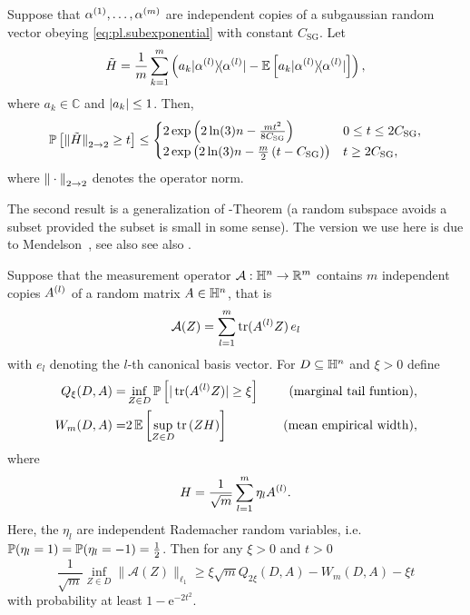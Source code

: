 \begin{theorem}%
  \label{thm:bernstein}
  Suppose that $\alpha^{(1)},\ldots,\alpha^{(m)}$ are independent copies of a subgaussian random vector obeying \cref{eq:pl.subexponential} with constant $C_\mathrm{SG}$.
  Let
  \[
    \tilde{ H} = \frac{1}{m} \sum_{k=1}^m \left( a_k \ketbra{\alpha\ind{l}} - \mathbb{E} \left[ a_k \ketbra{\alpha\ind{l}} \right] \right),
    \label{eq:pl.Htilde}
  \]
  where $a_k \in \mathbb{C}$ and ${\vert a_k\vert} \leq 1$.
  Then,
  \begin{align}
    \mathbb{P} \left[ {\Vert\tilde{ H}\Vert}_{2 \to 2} \geq t \right]
    \leq
    \begin{cases}
      2 \exp \left( 2 \ln (3) n  - \frac{mt^2}{8 C_\mathrm{SG}} \right) & 0 \leq t \leq 2C_\mathrm{SG}, \\
      2 \exp \left( 2 \ln (3) n - \frac{m}{2} \left( t - C_\mathrm{SG} \right)  \right) & t \geq 2 C_\mathrm{SG},
    \end{cases}
  \end{align}
  where ${\Vert\cdot\Vert}_{2 \to 2}$ denotes the operator norm.
\end{theorem}

The second result is a generalization of -Theorem \cite{Gordon_1988_On} (a random subspace avoids a subset provided the subset is small in some sense).
The version we use here is due to Mendelson~\cite{Mendelson_2015_Learning,Koltchinskii_2015_Bounding}, see also see also \cite{Tropp_2014_Convex}.

\begin{theorem}%
  \label{thm:mendelson}
  Suppose that the measurement operator $\mathcal{A}:\mathbb{H}^n \to \mathbb{R}^m$ contains $m$ independent copies $A^{(l)}$ of a random matrix $ A \in \mathbb{H}^n$, that is
  \[
    \label{eq:pl.measurement_operator_definition}
    \mathcal{A}(Z) = \sum_{l=1}^m \operatorname{tr} (A^{(l)}  Z) \,  {e_l}
  \]
  with $e_l$ denoting the $l$-th canonical basis vector.
  For $D \subseteq \mathbb{H}^n$ and $\xi >0$ define
  \begin{align}
    Q_\xi (D,  A) =& \inf_{ Z \in D}\mathbb{P} \left[ | \operatorname{tr} (A^{(l)}  Z) | \geq \xi \right] \quad &\textrm{(marginal tail funtion)}, \label{eq:pl.marginal_tail_function}\\
    W_m (D,  A) =& 2 \, \mathbb{E} \left[ \sup_{ Z \in D} \operatorname{tr} \left(  Z  H \right) \right] \quad &\textrm{(mean empirical width)},
  \end{align}
  where
  \[
    H= \frac{1}{\sqrt{m}} \sum_{l=1}^m \eta_l A^{(l)}.
  \]
  Here, the $\eta_l$ are independent Rademacher random variables, i.e.\ $\mathbb{P}(\eta_l = 1) = \mathbb{P}(\eta_l=-1) = \frac{1}{2}$.
  Then for any $\xi >0$ and $t >0$
  \[
    \frac{1}{\sqrt{m}}\inf_{ Z \in D} \| \mathcal{A}( Z) \|_{\ell_1} \geq \xi \sqrt{m} Q_{2\xi}(D,  A) -  W_m (D,  A)-\xi t \label{eq:pl.mendelson}
  \]
  with probability at least $1-\mathrm{e}^{-2t^2}$.
\end{theorem}

